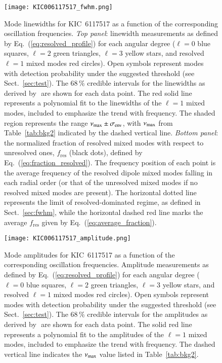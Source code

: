 \begin{figure}
   \centering
   \texttt{[image: KIC006117517\_fwhm.png]}
      \caption{Mode linewidths for KIC~6117517 as a function of the corresponding oscillation frequencies. \textit{Top panel}: linewidth measurements as defined by Eq.~(\ref{eq:resolved_profile}) for each angular degree ($\ell = 0$ blue squares, $\ell = 2$ green triangles, $\ell = 3$ yellow stars, and resolved $\ell = 1$ mixed modes red circles). Open symbols represent modes with detection probability under the suggested threshold (see Sect.~\ref{sec:test}). The 68\,\% credible intervals for the linewidths as derived by \diamonds\,\,are shown for each data point. The red solid line represents a polynomial fit to the linewidths of the $\ell = 1$ mixed modes, included to emphasize the trend with frequency. The shaded region represents the range $\nu_\mathrm{max} \pm \sigma_\mathrm{env}$, with $\nu_\mathrm{max}$ from Table~\ref{tab:bkg2} indicated by the dashed vertical line. \textit{Bottom panel}: the normalized fraction of resolved mixed modes with respect to unresolved ones, $f_\mathrm{res}$ (black dots), defined by Eq.~(\ref{eq:fraction_resolved}). The frequency position of each point is the average frequency of the resolved dipole mixed modes falling in each radial order (or that of the unresolved mixed modes if no resolved mixed modes are present). The horizontal dotted line represents the limit of resolved-dominated regime, as defined in Sect.~\ref{sec:fwhm}, while the horizontal dashed red line marks the average $f_\mathrm{res}$ given by Eq.~(\ref{eq:average_fraction}).}
    \label{fig:6117517fwhm}
\end{figure}

\begin{figure}
   \centering
   \texttt{[image: KIC006117517\_amplitude.png]}
      \caption{Mode amplitudes for KIC~6117517 as a function of the corresponding oscillation frequencies. Amplitude measurements as defined by Eq.~(\ref{eq:resolved_profile}) for each angular degree ($\ell = 0$ blue squares, $\ell = 2$ green triangles, $\ell = 3$ yellow stars, and resolved $\ell = 1$ mixed modes red circles). Open symbols represent modes with detection probability under the suggested threshold (see Sect.~\ref{sec:test}). The 68\,\% credible intervals for the amplitudes as derived by \diamonds\,\,are shown for each data point. The solid red line represents a polynomial fit to the amplitudes of the $\ell = 1$ mixed modes, included to emphasize the trend with frequency. The dashed vertical line indicates the $\nu_\mathrm{max}$ value listed in Table~\ref{tab:bkg2}.}
    \label{fig:6117517amplitude}
\end{figure}
\clearpage

